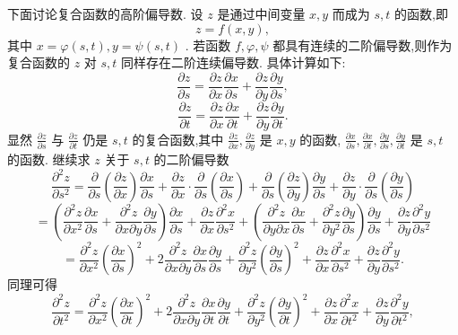 下面讨论复合函数的高阶偏导数. 设 \(z\) 是通过中间变量 \(x,y\) 而成为 \(s,t\) 的函数,即
\[
z = f\left( {x,y}\right) ,
\]
其中 \(x = \varphi \left( {s,t}\right) ,y = \psi \left( {s,t}\right)\) . 若函数 \(f,\varphi ,\psi\) 都具有连续的二阶偏导数,则作为复合函数的 \(z\) 对 \(s,t\) 同样存在二阶连续偏导数. 具体计算如下:
\[
\frac{\partial z}{\partial s} = \frac{\partial z}{\partial x}\frac{\partial x}{\partial s} + \frac{\partial z}{\partial y}\frac{\partial y}{\partial s},
\]
\[
\frac{\partial z}{\partial t} = \frac{\partial z}{\partial x}\frac{\partial x}{\partial t} + \frac{\partial z}{\partial y}\frac{\partial y}{\partial t}.
\]
显然 \(\frac{\partial z}{\partial s}\) 与 \(\frac{\partial z}{\partial t}\) 仍是 \(s,t\) 的复合函数,其中 \(\frac{\partial z}{\partial x},\frac{\partial z}{\partial y}\) 是 \(x,y\) 的函数, \(\frac{\partial x}{\partial s},\frac{\partial x}{\partial t},\frac{\partial y}{\partial s},\frac{\partial y}{\partial t}\) 是 \(s,t\) 的函数. 继续求 \(z\) 关于 \(s,t\) 的二阶偏导数
\[
\frac{{\partial }^{2}z}{\partial {s}^{2}} = \frac{\partial }{\partial s}\left( \frac{\partial z}{\partial x}\right) \frac{\partial x}{\partial s} + \frac{\partial z}{\partial x} \cdot  \frac{\partial }{\partial s}\left( \frac{\partial x}{\partial s}\right)  + \frac{\partial }{\partial s}\left( \frac{\partial z}{\partial y}\right) \frac{\partial y}{\partial s} + \frac{\partial z}{\partial y} \cdot  \frac{\partial }{\partial s}\left( \frac{\partial y}{\partial s}\right)
\]
\[
= \left( {\frac{{\partial }^{2}z}{\partial {x}^{2}}\frac{\partial x}{\partial s} + \frac{{\partial }^{2}z}{\partial x\partial y}\frac{\partial y}{\partial s}}\right) \frac{\partial x}{\partial s} + \frac{\partial z}{\partial x}\frac{{\partial }^{2}x}{\partial {s}^{2}} + \left( {\frac{{\partial }^{2}z}{\partial y\partial x}\frac{\partial x}{\partial s} + \frac{{\partial }^{2}z}{\partial {y}^{2}}\frac{\partial y}{\partial s}}\right) \frac{\partial y}{\partial s} + \frac{\partial z}{\partial y}\frac{{\partial }^{2}y}{\partial {s}^{2}}
\]
\[
= \frac{{\partial }^{2}z}{\partial {x}^{2}}{\left( \frac{\partial x}{\partial s}\right) }^{2} + 2\frac{{\partial }^{2}z}{\partial x\partial y}\frac{\partial x}{\partial s}\frac{\partial y}{\partial s} + \frac{{\partial }^{2}z}{\partial {y}^{2}}{\left( \frac{\partial y}{\partial s}\right) }^{2} + \frac{\partial z}{\partial x}\frac{{\partial }^{2}x}{\partial {s}^{2}} + \frac{\partial z}{\partial y}\frac{{\partial }^{2}y}{\partial {s}^{2}}.
\]
同理可得
\[
\frac{{\partial }^{2}z}{\partial {t}^{2}} = \frac{{\partial }^{2}z}{\partial {x}^{2}}{\left( \frac{\partial x}{\partial t}\right) }^{2} + 2\frac{{\partial }^{2}z}{\partial x\partial y}\frac{\partial x}{\partial t}\frac{\partial y}{\partial t} + \frac{{\partial }^{2}z}{\partial {y}^{2}}{\left( \frac{\partial y}{\partial t}\right) }^{2} + \frac{\partial z}{\partial x}\frac{{\partial }^{2}x}{\partial {t}^{2}} + \frac{\partial z}{\partial y}\frac{{\partial }^{2}y}{\partial {t}^{2}},
\]
